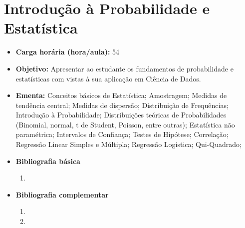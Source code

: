 \documentclass[11pt,fleqn]{book} %
\begin{document}
\section{Introdução à Probabilidade e Estatística}\label{4_probest}
\begin{itemize}
	\item \textbf{Carga horária (hora/aula):} 54
	\item \textbf{Objetivo:} Apresentar ao estudante os fundamentos de probabilidade e estatísticas com vistas à sua aplicação em Ciência de Dados.
	\item \textbf{Ementa:} 
	Conceitos básicos de Estatística; 
	Amostragem; 
	Medidas de tendência central; 
	Medidas de dispersão; 
	Distribuição de Frequências; 
	Introdução à Probabilidade; 
	Distribuições teóricas de Probabilidades (Binomial, normal, t de Student, Poisson, entre outras); 
	Estatística não paramétrica; 
	Intervalos de Confiança; 
	Testes de Hipótese; 
	Correlação; 
	Regressão Linear Simples e Múltipla; 
	Regressão Logística; 
	Qui-Quadrado;
	\item \textbf{Bibliografia básica}
	\begin{enumerate}
		\item 
	\end{enumerate}
	\item \textbf{Bibliografia complementar}
	\begin{enumerate}
		\item
		\item 
	\end{enumerate}
\end{itemize}


\newpage
\end{document}
